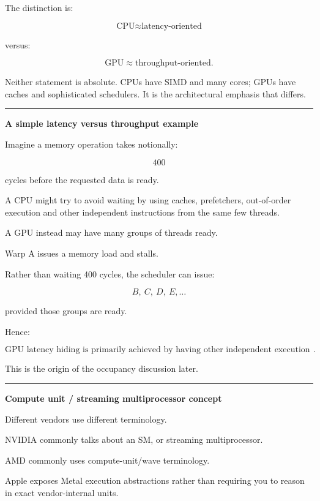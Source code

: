 The distinction is:

\[
\boxed{
\text{CPU}\approx\text{latency-oriented}
}
\]

versus:

\[
\boxed{
\text{GPU}\approx\text{throughput-oriented}.
}
\]

Neither statement is absolute. CPUs have SIMD and many cores; GPUs have caches and sophisticated schedulers. It is the architectural emphasis that differs.

\begin{center}\rule{0.5\linewidth}{0.5pt}\end{center}

\textbf{A simple latency versus throughput example}

Imagine a memory operation takes notionally:

\[
400
\]

cycles before the requested data is ready.

A CPU might try to avoid waiting by using caches, prefetchers, out-of-order execution and other independent instructions from the same few threads.

A GPU instead may have many groups of threads ready.

Warp A issues a memory load and stalls.

Rather than waiting 400 cycles, the scheduler can issue:

\[
B,\ C,\ D,\ E,\dots
\]

provided those groups are ready.

Hence:

\[
\boxed{
\text{GPU latency hiding is primarily achieved by having other independent execution groups resident}.
}
\]

This is the origin of the occupancy discussion later.

\begin{center}\rule{0.5\linewidth}{0.5pt}\end{center}

\textbf{Compute unit / streaming multiprocessor concept}

Different vendors use different terminology.

NVIDIA commonly talks about an SM, or streaming multiprocessor.

AMD commonly uses compute-unit/wave terminology.

Apple exposes Metal execution abstractions rather than requiring you to reason in exact vendor-internal units.

